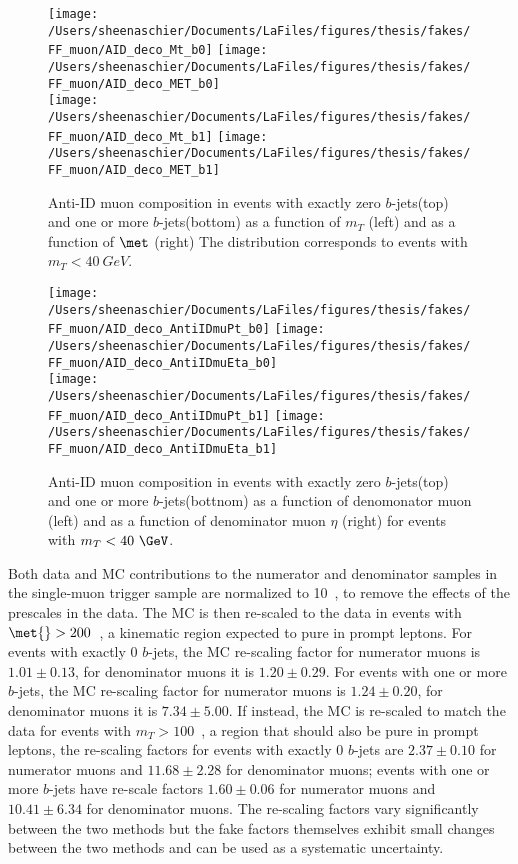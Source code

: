 \documentclass[11pt, oneside]{article}   	%
\begin{document}
\begin{figure}[htb]
        \centering
        \texttt{[image: /Users/sheenaschier/Documents/LaFiles/figures/thesis/fakes/FF\_muon/AID\_deco\_Mt\_b0]}
        \texttt{[image: /Users/sheenaschier/Documents/LaFiles/figures/thesis/fakes/FF\_muon/AID\_deco\_MET\_b0]}\\
        \texttt{[image: /Users/sheenaschier/Documents/LaFiles/figures/thesis/fakes/FF\_muon/AID\_deco\_Mt\_b1]}
        \texttt{[image: /Users/sheenaschier/Documents/LaFiles/figures/thesis/fakes/FF\_muon/AID\_deco\_MET\_b1]}\\
        \caption{Anti-ID muon composition in events with exactly zero $b$-jets(top) and one or more $b$-jets(bottom) as a function of $m_{T}$ (left) and as a function of $\met$ (right) The \met{} distribution corresponds to events with $m_{T} < 40~GeV$.}
        \label{fig:muDeco_1}
\end{figure}
\begin{figure}[htb]
        \centering
        \texttt{[image: /Users/sheenaschier/Documents/LaFiles/figures/thesis/fakes/FF\_muon/AID\_deco\_AntiIDmuPt\_b0]}
        \texttt{[image: /Users/sheenaschier/Documents/LaFiles/figures/thesis/fakes/FF\_muon/AID\_deco\_AntiIDmuEta\_b0]}\\
        \texttt{[image: /Users/sheenaschier/Documents/LaFiles/figures/thesis/fakes/FF\_muon/AID\_deco\_AntiIDmuPt\_b1]}
        \texttt{[image: /Users/sheenaschier/Documents/LaFiles/figures/thesis/fakes/FF\_muon/AID\_deco\_AntiIDmuEta\_b1]}\\
        \caption{Anti-ID muon composition in events with exactly zero $b$-jets(top) and one or more $b$-jets(bottnom) as a function of denomonator muon \pt{} (left) and as a function of denominator muon $\eta$ (right) for events with $m_{T} < 40~\GeV$. }
        \label{fig:muDeco_2}
\end{figure}

Both data and MC contributions to the numerator and denominator samples in the single-muon trigger sample are normalized to 10~\ipb, to remove the effects of the prescales in the data.  The MC is then re-scaled to the data in events with $\met{}>200$~\GeV, a kinematic region expected to pure in prompt leptons.  For events with exactly 0 $b$-jets, the MC re-scaling factor for numerator muons is $1.01 \pm 0.13$, for denominator muons it is $1.20\pm 0.29$. For events with one or more $b$-jets, the MC re-scaling factor for numerator muons is $1.24 \pm 0.20$, for denominator muons it is $7.34\pm 5.00$. If instead, the MC is re-scaled to match the data for events with $m_{T} > 100$~\GeV, a region that should also be pure in prompt leptons, the re-scaling factors for events with exactly 0 $b$-jets are $2.37 \pm 0.10$ for numerator muons and $11.68 \pm 2.28$ for denominator muons; events with one or more $b$-jets have re-scale factors $1.60 \pm 0.06$ for numerator muons and $10.41 \pm 6.34$ for denominator muons. The re-scaling factors vary significantly between the two methods but the fake factors themselves exhibit small changes between the two methods and can be used as a systematic uncertainty.
\end{document}

